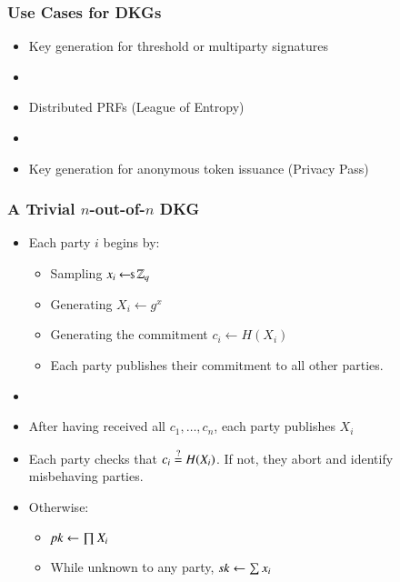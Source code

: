 \documentclass[hyperref={pdfpagelabels=true},table,dvipsnames,14pt,aspectratio=169]{beamer}
\begin{document}
\begin{frame}
  \frametitle{Use Cases for DKGs}

  \begin{itemize}
    \item<1-> Key generation for threshold or multiparty signatures
    \item[]
    \item<2-> Distributed PRFs (League of Entropy)
    \item[]
    \item<3-> Key generation for anonymous token issuance (Privacy Pass)
  \end{itemize}
\end{frame}


\begin{frame}
  \frametitle{A Trivial $n$-out-of-$n$ DKG}

  \begin{itemize}
    \item<1-> Each party $i$ begins by:

  \begin{itemize}
    \item<2-> Sampling $x_i \hskip2.3pt{\gets\!\!\mbox{\scriptsize${\$}$\normalsize}}\, \mathbb{Z}_q$
    \item<3-> Generating $X_i \gets g^x$
    \item<4-> Generating the commitment $c_i \gets H(X_i)$
    \item<5-> Each party publishes their commitment to all other parties.
  \end{itemize}
    \item[]
    \item<6-> After having received all $c_1, \ldots, c_n$, each party publishes $X_i$
    \item<7-> Each party checks that $c_i \stackrel{?}{=} H(X_i)$. If not, they abort and identify misbehaving parties.
    \item<8-> Otherwise:
  \begin{itemize}
    \item<9-> $\mathit{pk} \gets \prod X_i$
    \item<10-> While unknown to any party, $\mathit{sk} \gets \sum x_i$
  \end{itemize}

  \end{itemize}
\end{frame}
\end{document}
